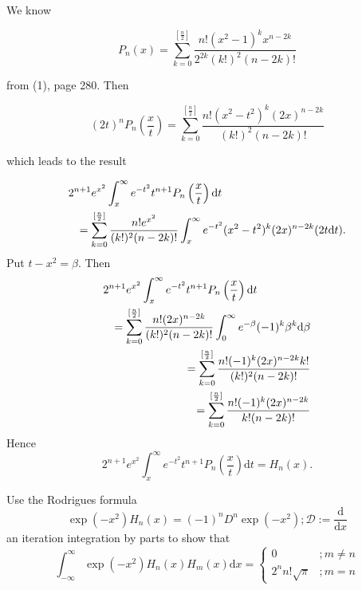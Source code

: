 \begin{solution}
We know

$$P_n(x) = \displaystyle\sum_{k=0}^{[\frac{n}{2}]} \dfrac{n! (x^2-1)^k x^{n-2k}}{2^{2k}(k!)^2 (n-2k)!}$$

from (1), page 280. Then

$$(2t)^n P_n \left( \dfrac{x}{t} \right) = \displaystyle\sum_{k=0}^{[\frac{n}{2}]} \dfrac{n! (x^2-t^2)^k (2x)^{n-2k}}{(k!)^2 (n-2k)!}$$

which leads to the result

\begin{eqnarray*}
\lefteqn{2^{n+1} e^{x^2} \displaystyle\int_x^{\infty} e^{-t^2} t^{n+1} P_n \left( \dfrac{x}{t} \right) \mathrm{d}t} \\
&& = \displaystyle\sum_{k=0}^{[\frac{n}{2}]} \dfrac{n! e^{x^2}}{(k!)^2 (n-2k)!} \displaystyle\int_x^{\infty} e^{-t^2} (x^2-t^2)^k (2x)^{n-2k}(2t \mathrm{d}t).
\end{eqnarray*}
Put $t-x^2=\beta$. Then
\begin{eqnarray*}
\lefteqn{2^{n+1} e^{x^2} \displaystyle\int_x^{\infty} e^{-t^2} t^{n+1}P_n \left( \dfrac{x}{t} \right) \mathrm{d}t} \\
& &= \displaystyle\sum_{k=0}^{[\frac{n}{2}]} \dfrac{n! (2x)^{n-2k}}{(k!)^2 (n-2k)!} \displaystyle\int_0^{\infty} e^{-\beta} (-1)^k \beta^k \mathrm{d} \beta \\
& &= \displaystyle\sum_{k=0}^{[\frac{n}{2}]} \dfrac{n! (-1)^k (2x)^{n-2k} k!}{(k!)^2 (n-2k)!} \\
& &= \displaystyle\sum_{k=0}^{[\frac{n}{2}]} \dfrac{n! (-1)^k (2x)^{n-2k}}{k! (n-2k)!}
\end{eqnarray*}
Hence
$$2^{n+1} e^{x^2} \displaystyle\int_x^{\infty} e^{-t^2} t^{n+1} P_n \left( \dfrac{x}{t} \right) \mathrm{d}t = H_n(x).$$
\end{solution}
\begin{problem}\label{problem7chapter11}
Use the Rodrigues formula
$$\exp(-x^2)H_n(x) = (-1)^n D^n \exp(-x^2); \mathscr{D} := \dfrac{\mathrm{d}}{\mathrm{d}x}$$
an iteration integration by parts to show that
$$\displaystyle\int_{-\infty}^{\infty} \exp(-x^2)H_n(x) H_m(x) \mathrm{d}x = \left\{ \begin{array}{ll}
0 &; m \neq n \\
2^n n! \sqrt{\pi} &; m=n
\end{array} \right.$$
\end{problem}

